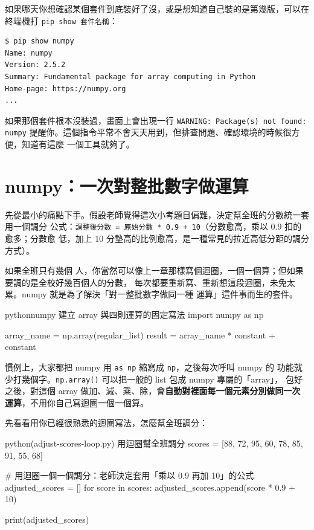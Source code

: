 如果哪天你想確認某個套件到底裝好了沒，或是想知道自己裝的是第幾版，可以在終端機打
\texttt{pip show 套件名稱}：

\begin{verbatim}
$ pip show numpy
Name: numpy
Version: 2.5.2
Summary: Fundamental package for array computing in Python
Home-page: https://numpy.org
...
\end{verbatim}

如果那個套件根本沒裝過，畫面上會出現一行 \texttt{WARNING: Package(s) not found:
numpy} 提醒你。這個指令平常不會天天用到，但排查問題、確認環境的時候很方便，知道有這麼
一個工具就夠了。

\section{numpy：一次對整批數字做運算}
\label{sec:numpy-vectorize}

先從最小的痛點下手。假設老師覺得這次小考題目偏難，決定幫全班的分數統一套用一個調分
公式：\texttt{調整後分數 = 原始分數 * 0.9 + 10}（分數愈高，乘以 0.9 扣的愈多；分數愈
低，加上 10 分墊高的比例愈高，是一種常見的拉近高低分距的調分方式）。

如果全班只有幾個
人，你當然可以像上一章那樣寫個迴圈，一個一個算；但如果要調的是全校好幾百個人的分數，
每次都要重新寫、重新想這段迴圈，未免太累。numpy 就是為了解決「對一整批數字做同一種
運算」這件事而生的套件。

\begin{code}{python}{numpy 建立 array 與四則運算的固定寫法}
import numpy as np

array_name = np.array(regular_list)
result = array_name * constant + constant
\end{code}

慣例上，大家都把 numpy 用 \texttt{as np} 縮寫成 \texttt{np}，之後每次呼叫 numpy 的
功能就少打幾個字。\texttt{np.array()} 可以把一般的 list 包成 numpy 專屬的「array」，
包好之後，對這個 array 做加、減、乘、除，會\textbf{自動對裡面每一個元素分別做同一次
運算}，不用你自己寫迴圈一個一個算。

先看看用你已經很熟悉的迴圈寫法，怎麼幫全班調分：

\begin{example}{python}{(adjust-scores-loop.py) 用迴圈幫全班調分}
scores = [88, 72, 95, 60, 78, 85, 91, 55, 68]

# 用迴圈一個一個調分：老師決定套用「乘以 0.9 再加 10」的公式
adjusted_scores = []
for score in scores:
    adjusted_scores.append(score * 0.9 + 10)

print(adjusted_scores)
\end{example}

